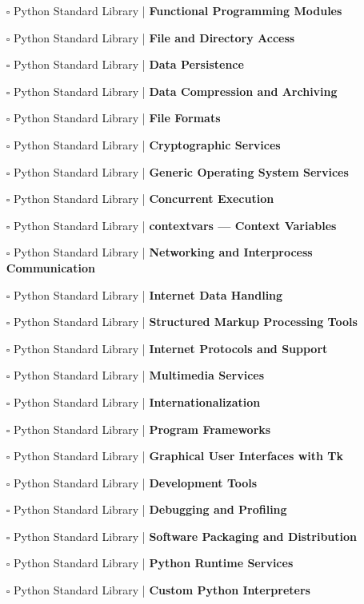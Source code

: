 \documentclass[a4, landscape, 12pt]{article}
\newcommand{\checkbox}{$\square$}%
\begin{document}
\begin{itemize}
{}
\item [\checkbox]  Python Standard Library | \textbf{ Functional Programming Modules
}
\item [\checkbox]  Python Standard Library | \textbf{ File and Directory Access
}
\item [\checkbox]  Python Standard Library | \textbf{ Data Persistence
}
\item [\checkbox]  Python Standard Library | \textbf{ Data Compression and Archiving
}
\item [\checkbox]  Python Standard Library | \textbf{ File Formats
}
\item [\checkbox]  Python Standard Library | \textbf{ Cryptographic Services
}
\item [\checkbox]  Python Standard Library | \textbf{ Generic Operating System Services
}
\item [\checkbox]  Python Standard Library | \textbf{ Concurrent Execution
}
\item [\checkbox]  Python Standard Library | \textbf{ contextvars — Context Variables
}
\item [\checkbox]  Python Standard Library | \textbf{ Networking and Interprocess Communication
}
\item [\checkbox]  Python Standard Library | \textbf{ Internet Data Handling
}
\item [\checkbox]  Python Standard Library | \textbf{ Structured Markup Processing Tools
}
\item [\checkbox]  Python Standard Library | \textbf{ Internet Protocols and Support
}
\item [\checkbox]  Python Standard Library | \textbf{ Multimedia Services
}
\item [\checkbox]  Python Standard Library | \textbf{ Internationalization
}
\item [\checkbox]  Python Standard Library | \textbf{ Program Frameworks
}
\item [\checkbox]  Python Standard Library | \textbf{ Graphical User Interfaces with Tk
}
\item [\checkbox]  Python Standard Library | \textbf{ Development Tools
}
\item [\checkbox]  Python Standard Library | \textbf{ Debugging and Profiling
}
\item [\checkbox]  Python Standard Library | \textbf{ Software Packaging and Distribution
}
\item [\checkbox]  Python Standard Library | \textbf{ Python Runtime Services
}
\item [\checkbox]  Python Standard Library | \textbf{ Custom Python Interpreters
}
\end{itemize}
\end{document}
